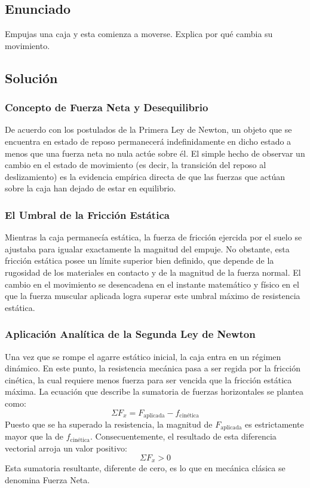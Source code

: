 \documentclass[12pt]{article}
\begin{document}
\newpage

\subsection*{Enunciado}
Empujas una caja y esta comienza a moverse. Explica por qué cambia su movimiento.

\subsection*{Solución}

\subsubsection*{Concepto de Fuerza Neta y Desequilibrio}
De acuerdo con los postulados de la Primera Ley de Newton, un objeto que se encuentra en estado de reposo permanecerá indefinidamente en dicho estado a menos que una fuerza neta no nula actúe sobre él. El simple hecho de observar un cambio en el estado de movimiento (es decir, la transición del reposo al deslizamiento) es la evidencia empírica directa de que las fuerzas que actúan sobre la caja han dejado de estar en equilibrio.

\subsubsection*{El Umbral de la Fricción Estática}
Mientras la caja permanecía estática, la fuerza de fricción ejercida por el suelo se ajustaba para igualar exactamente la magnitud del empuje. No obstante, esta fricción estática posee un límite superior bien definido, que depende de la rugosidad de los materiales en contacto y de la magnitud de la fuerza normal. El cambio en el movimiento se desencadena en el instante matemático y físico en el que la fuerza muscular aplicada logra superar este umbral máximo de resistencia estática.

\subsubsection*{Aplicación Analítica de la Segunda Ley de Newton}
Una vez que se rompe el agarre estático inicial, la caja entra en un régimen dinámico. En este punto, la resistencia mecánica pasa a ser regida por la fricción cinética, la cual requiere menos fuerza para ser vencida que la fricción estática máxima. La ecuación que describe la sumatoria de fuerzas horizontales se plantea como:
\begin{equation}
    \Sigma F_x = F_{\text{aplicada}} - f_{\text{cinética}}
\end{equation}
Puesto que se ha superado la resistencia, la magnitud de $F_{\text{aplicada}}$ es estrictamente mayor que la de $f_{\text{cinética}}$. Consecuentemente, el resultado de esta diferencia vectorial arroja un valor positivo:
\begin{equation}
    \Sigma F_x > 0
\end{equation}
Esta sumatoria resultante, diferente de cero, es lo que en mecánica clásica se denomina Fuerza Neta.
\end{document}
